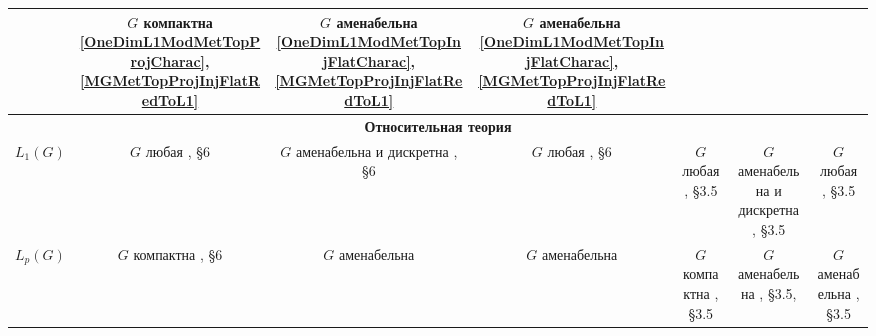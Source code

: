 \documentclass{article}
\numberwithin{equation}{section}
\theoremstyle{plain}
\theoremstyle{definition}
\begin{document}
\begin{fulltext}
\begin{table}[ht]
\begin{tiny}
{\begin{tabular}{|c|c|c|c|c|c|c|}
{    			} & 
    			\shortstack{
    				$G$ компактна \\ 
    				\ref{OneDimL1ModMetTopProjCharac},
    				\ref{MGMetTopProjInjFlatRedToL1}
    			} & 
    			\shortstack{
    				$G$ аменабельна \\ 
    				\ref{OneDimL1ModMetTopInjFlatCharac},
    				\ref{MGMetTopProjInjFlatRedToL1}
    			} & 
    			\shortstack{
    				$G$ аменабельна \\ 
    				\ref{OneDimL1ModMetTopInjFlatCharac},
    				\ref{MGMetTopProjInjFlatRedToL1}
    			} \\ 
            \hline
                \multicolumn{7}{c}{\textbf{Относительная теория}} \\
            \hline
                $L_1(G)$ & 
    			\shortstack{
    				$G$ любая \\ \cite{DalPolHomolPropGrAlg}, \S 6
    			} & 
    			\shortstack{
    				$G$ аменабельна \\  и дискретна \\ \cite{DalPolHomolPropGrAlg}, \S 6
    			} & 
    			\shortstack{
    				$G$ любая \\ \cite{DalPolHomolPropGrAlg}, \S 6
    			} & 
    			\shortstack{
    				$G$ любая \\ \cite{RamsHomPropSemgroupAlg}, \S 3.5
    			} & 
    			\shortstack{
    				$G$ аменабельна \\  и дискретна \\ \cite{RamsHomPropSemgroupAlg}, \S 3.5
    			} & 
    			\shortstack{
    				$G$ любая \\ \cite{RamsHomPropSemgroupAlg}, \S 3.5
    			} \\ 
            \hline
                $L_p(G)$ & 
    			\shortstack{
    				$G$ компактна \\ \cite{DalPolHomolPropGrAlg}, \S 6
    			} & 
    			\shortstack{
    				$G$ аменабельна \\ \cite{RachInjModAndAmenGr}
    			} & 
    			\shortstack{
    				$G$ аменабельна \\ \cite{RachInjModAndAmenGr}
    			} & 
    			\shortstack{
    				$G$ компактна \\ \cite{RamsHomPropSemgroupAlg}, \S 3.5
    			} & 
    			\shortstack{
    				$G$ аменабельна \\ \cite{RamsHomPropSemgroupAlg}, \S 3.5, \cite{RachInjModAndAmenGr}
    			} & 
    			\shortstack{
    				$G$ аменабельна \\ \cite{RamsHomPropSemgroupAlg}, \S 3.5
    			} \\

\end{tabular}}
\end{tiny}
\end{table}
\end{fulltext}
\end{document}
